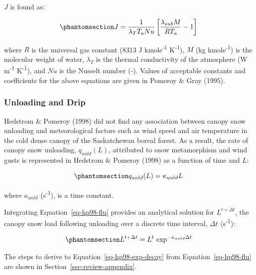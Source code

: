 \documentclass[
  letterpaper,
]{tex/uofsthesis-cs}
\begin{document}
\(J\) is found as:

\begin{equation}\phantomsection\label{eq-pom98-j}{
J = \frac{1}{\lambda_T T_a Nu} \left[ \frac{\lambda_{sub} M}{R T_a} -1 \right]
}\end{equation}

where \(R\) is the universal gas constant (8313 J
kmole\textsuperscript{-1} K\textsuperscript{-1}), \(M\) (kg
kmole\textsuperscript{-1}) is the molecular weight of water,
\(\lambda_T\) is the thermal conductivity of the atmosphere (W
m\textsuperscript{-1} K\textsuperscript{-1}), and \(Nu\) is the Nusselt
number (-). Values of acceptable constants and coefficients for the
above equations are given in Pomeroy \& Gray (1995).

\subsubsection{Unloading and Drip}\label{sec-unloading}

Hedstrom \& Pomeroy (1998) did not find any association between canopy
snow unloading and meteorological factors such as wind speed and air
temperature in the cold dense canopy of the Saskatchewan boreal forest.
As a result, the rate of canopy snow unloading, \(q_{unld}(L)\),
attributed to snow metamorphism and wind gusts is represented in
Hedstrom \& Pomeroy (1998) as a function of time and \(L\):

\begin{equation}\phantomsection\label{eq-hp98-flu}{
q_{unld}(L) = \kappa_{unld} L
}\end{equation}

where \(\kappa_{unld}\) (s\textsuperscript{-1}), is a time constant.

Integrating Equation~\ref{eq-hp98-flu} provides an analytical solution
for \(L^{t+\Delta t}\), the canopy snow load following unloading over a
discrete time interval, \(\Delta t\) (s\textsuperscript{-1}):

\begin{equation}\phantomsection\label{eq-hp98-exp-decay}{
L^{t+\Delta t} =L^t\  \text{exp} ^{-\kappa_{unld}\Delta t}
}\end{equation}

The steps to derive to Equation~\ref{eq-hp98-exp-decay} from
Equation~\ref{eq-hp98-flu} are shown in
Section~\ref{sec-review-appendix}.
\end{document}
